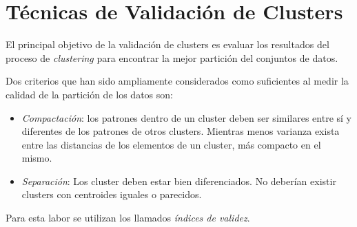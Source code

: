 \section{Técnicas de Validación de Clusters} \label{sect:tval}


    El principal objetivo de la validación de clusters es evaluar los resultados
del proceso de \emph{clustering} para encontrar la mejor partición del conjuntos
de datos.

    Dos criterios que han sido ampliamente considerados como suficientes al
medir la calidad de la partición de los datos son:
\begin{itemize}
    \item \emph{Compactación}: los patrones dentro de un cluster deben ser
similares entre sí y diferentes de los patrones de otros clusters. Mientras
menos varianza exista entre las distancias de los elementos de un cluster, más
compacto en el mismo.
    \item \emph{Separación}: Los cluster deben estar bien diferenciados. No
deberían existir clusters con centroides iguales o parecidos.
\end{itemize}

Para esta labor se utilizan los llamados \emph{índices de validez}.


